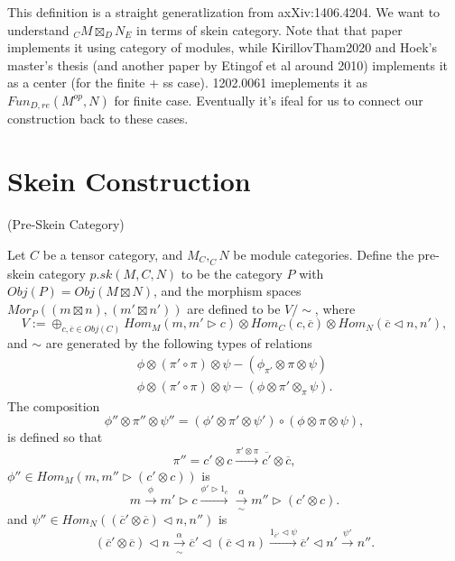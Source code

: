 \begin{remark}
  This definition is a straight generatlization from axXiv:1406.4204. We want
  to understand $_{C}M \boxtimes_{D} N_{E}$ in terms of skein category. Note that that
  paper implements it using category of modules, while KirillovTham2020 and
  Hoek's master's thesis (and another paper by Etingof et al around 2010)
  implements it as a center (for the finite + ss case). 1202.0061 imeplements
  it as $Fun_{D,re}(M^{op},N)$ for finite case. Eventually it's ifeal for us
  to connect our construction back to these cases.
\end{remark}

\section{Skein Construction}\label{section/skein-construction}

\begin{definition} (Pre-Skein Category)

  \noindent Let $C$ be a tensor category, and $M_{C}, _{C}N$ be module
  categories. Define the pre-skein category $p.sk(M,C,N)$ to be the category
  $P$ with $Obj(P) = Obj(M \boxtimes N)$, and the morphism spaces
  $Mor_{P}((m \boxtimes n), (m' \boxtimes n'))$ are defined to be $V / \sim$,
  where
  \[
    V := \oplus_{c,\overline{c} \in Obj(C)} Hom_{M}(m, m' \rhd c) \otimes Hom_{C}(c,\overline{c}) \otimes Hom_{N} (\overline{c} \lhd n, n'),
  \]
  and $\sim$ are generated by the following types of relations
  \begin{align}
    \phi \otimes (\pi' \circ \pi) \otimes \psi - (\phi_{\pi'} \otimes \pi \otimes \psi)\\
    \phi \otimes (\pi' \circ \pi) \otimes \psi - (\phi \otimes \pi' \otimes _{\pi}\psi).
  \end{align}
  The composition
  \[
    \phi'' \otimes \pi'' \otimes \psi'' =
    (\phi' \otimes \pi' \otimes \psi' ) \circ (
    \phi \otimes \pi \otimes \psi ),
  \]
  is defined so that
  \[
    \pi'' = c' \otimes c \xrightarrow{\pi' \otimes \pi} \overline{c'} \otimes \overline{c},
  \]
  \noindent $\phi'' \in Hom_{M}(m, m'' \rhd (c' \otimes c))$ is
  \[
    m \xrightarrow{\phi} m' \rhd c \xrightarrow{\phi' \rhd 1_{c}} \xrightarrow[\sim]{\alpha} m'' \rhd (c' \otimes c).
  \]
  \noindent and $\psi'' \in Hom_{N}((\overline{c}' \otimes \overline{c}) \lhd n, n'')$ is
  \[
    (\overline{c}' \otimes \overline{c}) \lhd n \xrightarrow[\sim]{\alpha} \overline{c}' \lhd (\overline{c} \lhd n) \xrightarrow{1_{\overline{c}'} \lhd \psi} \overline{c}' \lhd n' \xrightarrow{\psi'} n''.
  \]

\end{definition}

